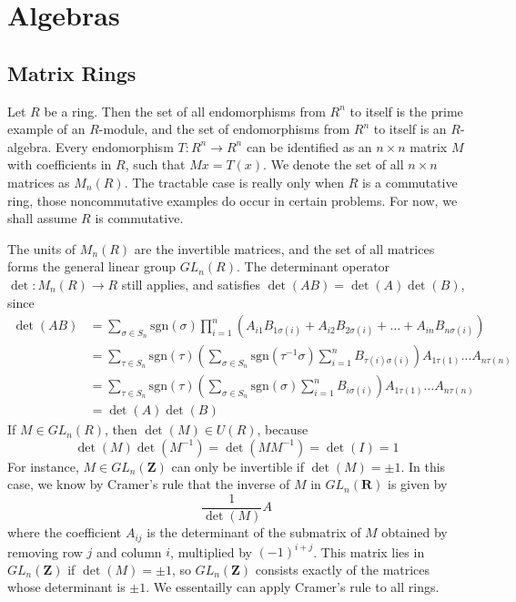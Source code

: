 \chapter{Algebras}

\section{Matrix Rings}

Let $R$ be a ring. Then the set of all endomorphisms from $R^n$ to itself is the prime example of an $R$-module, and the set of endomorphisms from $R^n$ to itself is an $R$-algebra. Every endomorphism $T:R^n \to R^n$ can be identified as an $n \times n$ matrix $M$ with coefficients in $R$, such that $Mx = T(x)$. We denote the set of all $n \times n$ matrices as $M_n(R)$. The tractable case is really only when $R$ is a commutative ring, those noncommutative examples do occur in certain problems. For now, we shall assume $R$ is commutative.

The units of $M_n(R)$ are the invertible matrices, and the set of all matrices forms the general linear group $GL_n(R)$. The determinant operator $\det: M_n(R) \to R$ still applies, and satisfies $\det(AB) = \det(A) \det(B)$, since
%
\begin{align*}
    \det(AB) &= \sum_{\sigma \in S_n} \text{sgn}(\sigma) \prod_{i = 1}^n (A_{i1} B_{1\sigma(i)} + A_{i2} B_{2 \sigma(i)} + \dots + A_{in} B_{n \sigma(i)})\\
    &= \sum_{\tau \in S_n} \text{sgn}(\tau) \left( \sum_{\sigma \in S_n} \text{sgn}(\tau^{-1} \sigma) \sum_{i = 1}^n B_{\tau(i) \sigma(i)} \right) A_{1\tau(1)} \dots A_{n \tau(n)}\\
    &= \sum_{\tau \in S_n} \text{sgn}(\tau) \left( \sum_{\sigma \in S_n} \text{sgn}(\sigma) \sum_{i = 1}^n B_{i \sigma(i)} \right) A_{1\tau(1)} \dots A_{n \tau(n)}\\
    &= \det(A) \det(B)
\end{align*}
%
If $M \in GL_n(R)$, then $\det(M) \in U(R)$, because
%
\[ \det(M) \det(M^{-1}) = \det(MM^{-1}) = \det(I) = 1 \]
%
For instance, $M \in GL_n(\mathbf{Z})$ can only be invertible if $\det(M) = \pm 1$. In this case, we know by Cramer's rule that the inverse of $M$ in $GL_n(\mathbf{R})$ is given by
%
\[ \frac{1}{\det(M)} A \]
%
where the coefficient $A_{ij}$ is the determinant of the submatrix of $M$ obtained by removing row $j$ and column $i$, multiplied by $(-1)^{i+j}$. This matrix lies in $GL_n(\mathbf{Z})$ if $\det(M) = \pm 1$, so $GL_n(\mathbf{Z})$ consists exactly of the matrices whose determinant is $\pm 1$. We essentailly can apply Cramer's rule to all rings.

